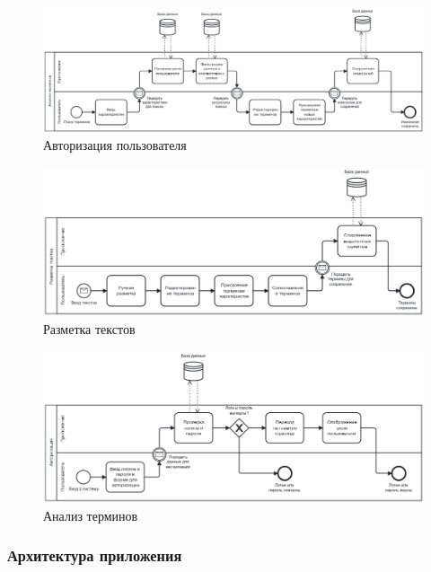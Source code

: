 \begin{figure}[h]
	\centering
	\includegraphics[width=\textwidth ]{img/BPMN/1.png}
	\caption{Авторизация пользователя}
	\label{fig:bpmn1}
\end{figure} 

\begin{figure}[h]
	\centering
	\includegraphics[width=\textwidth ]{img/BPMN/2.png}
	\caption{Разметка текстов}
	\label{fig:bpmn2}
\end{figure} 

\begin{figure}[h]
	\centering
	\includegraphics[width=\textwidth ]{img/BPMN/3.png}
	\caption{Анализ терминов}
	\label{fig:bpmn3}
\end{figure} 

\clearpage



\subsubsection{Архитектура приложения}

